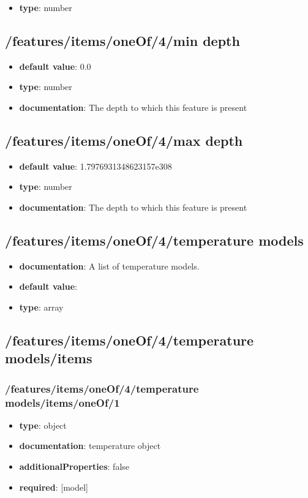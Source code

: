 \begin{itemize}\item {\bf type}: number
\end{itemize}\subsection{/features/items/oneOf/4/min depth}
\begin{itemize}\item {\bf default value}: 0.0
\item {\bf type}: number
\item {\bf documentation}: The depth to which this feature is present
\end{itemize}\subsection{/features/items/oneOf/4/max depth}
\begin{itemize}\item {\bf default value}: 1.7976931348623157e308
\item {\bf type}: number
\item {\bf documentation}: The depth to which this feature is present
\end{itemize}\subsection{/features/items/oneOf/4/temperature models}
\begin{itemize}\item {\bf documentation}: A list of temperature models.
\item {\bf default value}: 
\item {\bf type}: array
\end{itemize}\subsection{/features/items/oneOf/4/temperature models/items}

\subsubsection{/features/items/oneOf/4/temperature models/items/oneOf/1}
\begin{itemize}\item {\bf type}: object
\item {\bf documentation}: temperature object
\item {\bf additionalProperties}: false
\item {\bf required}: [model]\end{itemize}
